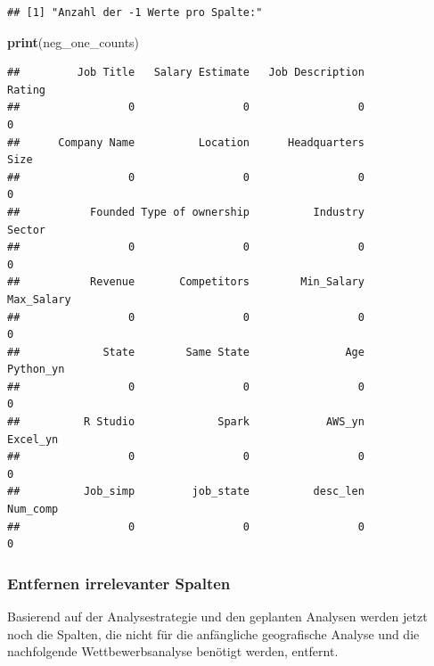 \documentclass[
]{article}
\newenvironment{Shaded}{\begin{snugshade}}{\end{snugshade}}
\newcommand{\FunctionTok}[1]{\textcolor[rgb]{0.13,0.29,0.53}{\textbf{#1}}}
\newcommand{\NormalTok}[1]{#1}
\begin{document}
\begin{verbatim}
## [1] "Anzahl der -1 Werte pro Spalte:"
\end{verbatim}

\begin{Shaded}
\begin{Highlighting}[]
\FunctionTok{print}\NormalTok{(neg\_one\_counts)}
\end{Highlighting}
\end{Shaded}

\begin{verbatim}
##         Job Title   Salary Estimate   Job Description            Rating 
##                 0                 0                 0                 0 
##      Company Name          Location      Headquarters              Size 
##                 0                 0                 0                 0 
##           Founded Type of ownership          Industry            Sector 
##                 0                 0                 0                 0 
##           Revenue       Competitors        Min_Salary        Max_Salary 
##                 0                 0                 0                 0 
##             State        Same State               Age         Python_yn 
##                 0                 0                 0                 0 
##          R Studio             Spark            AWS_yn          Excel_yn 
##                 0                 0                 0                 0 
##          Job_simp         job_state          desc_len          Num_comp 
##                 0                 0                 0                 0
\end{verbatim}

\subsubsection{Entfernen irrelevanter
Spalten}\label{entfernen-irrelevanter-spalten}

Basierend auf der Analysestrategie und den geplanten Analysen werden
jetzt noch die Spalten, die nicht für die anfängliche geografische
Analyse und die nachfolgende Wettbewerbsanalyse benötigt werden,
entfernt.
\end{document}
